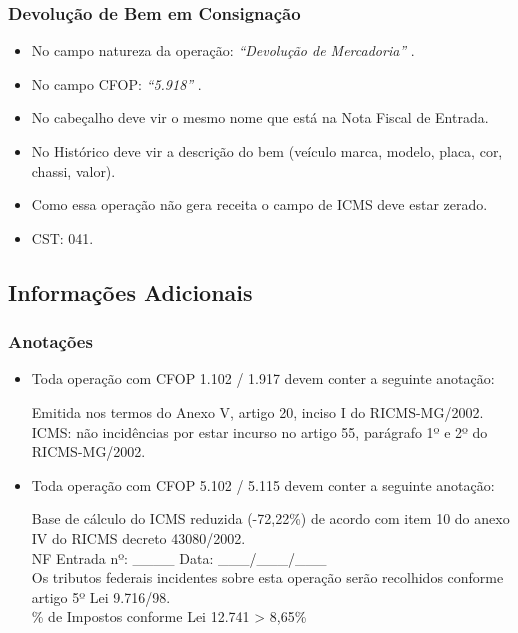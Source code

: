 \documentclass{article}
\newcommand{\itasp}[1]{
  \textit{``#1''}
}
\begin{document}
\subsubsection{Devolução de Bem em Consignação}
\label{emissaonfe:saida-devolucao-consig}
\begin{itemize}
  \item No campo natureza da operação: \itasp{Devolução de Mercadoria}.
  \item No campo CFOP: \itasp{5.918}.
  \item No cabeçalho deve vir o mesmo nome que está na Nota Fiscal de Entrada.
  \item No Histórico deve vir a descrição do bem (veículo marca, modelo, placa, cor, chassi, valor).
  \item Como essa operação não gera receita o campo de ICMS deve estar zerado.
  \item CST: 041.
\end{itemize}

\subsection{Informações Adicionais}
\label{emissaonfe:infos-ad}
\subsubsection{Anotações}
\label{emissaonfe:infos-ad-notes}
\begin{itemize}
  \item Toda operação com CFOP 1.102 / 1.917 devem conter a seguinte anotação:
  \begin{tcolorbox}
    Emitida nos termos do Anexo V, artigo 20, inciso I do RICMS-MG/2002. \\
    ICMS: não incidências por estar incurso no artigo 55, parágrafo 1º e 2º do RICMS-MG/2002.
  \end{tcolorbox}
  \item Toda operação com CFOP 5.102 / 5.115 devem conter a seguinte anotação:
  \begin{tcolorbox}
    Base de cálculo do ICMS reduzida (-72,22\%) de acordo com item 10 do anexo IV do RICMS decreto 43080/2002. \\
    NF Entrada nº: \_\_\_\_ Data: \_\_\_/\_\_\_/\_\_\_ \\
    Os tributos federais incidentes sobre esta operação serão recolhidos conforme artigo 5º Lei 9.716/98. \\
    \% de Impostos conforme Lei 12.741 > 8,65\%

  \end{tcolorbox}
\end{itemize}
\end{document}
